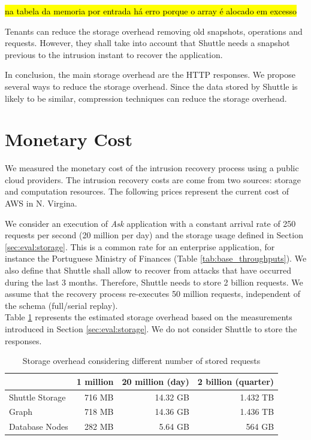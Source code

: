 \hl{na tabela da memoria por entrada há erro porque o array é alocado em excesso}


Tenants can reduce the storage overhead removing old snapshots, operations and requests. However, they shall take into account that Shuttle needs a snapshot previous to the intrusion instant to recover the application.

In conclusion, the main storage overhead are the \ac{HTTP} responses. We propose several ways to reduce the storage overhead. Since the data stored by Shuttle is likely to be similar, compression techniques can reduce the storage overhead.



\section{Monetary Cost}\label{sec:eval:cost}
We measured the monetary cost of the intrusion recovery process using a public cloud providers. The intrusion recovery costs are come from two sources: storage and computation resources. The following prices represent the current cost of \acf{AWS} in N. Virgina.

We consider an execution of \emph{Ask} application with a constant arrival rate of 250 requests per second (20 million per day) and the storage usage defined in Section \ref{sec:eval:storage}. This is a common rate for an enterprise application, for instance the Portuguese Ministry of Finances (Table \ref{tab:base_throughputs}). We also define that Shuttle shall allow to recover from attacks that have occurred during the last 3 months. Therefore, Shuttle needs to store 2 billion requests. We assume that the recovery process re-executes 50 million requests, independent of the schema (full/serial replay). \\

Table \ref{tab:storageScale} represents the estimated storage overhead based on the measurements introduced in Section \ref{sec:eval:storage}. We do not consider Shuttle to store the responses.%

\begin{table}[ht]
\centering
\begin{tabular}{l|rrr}
                  & 1 million   & 20 million (day)    & 2 billion (quarter) \\ \hline
Shuttle Storage   & 716 MB      & 14.32 GB            & 1.432 TB \\
Graph             & 718 MB      & 14.36 GB            & 1.436 TB \\
Database Nodes    & 282 MB      &  5.64 GB            & 564 GB   \\
\end{tabular}
\caption{Storage overhead considering different number of stored requests}
\label{tab:storageScale}
\end{table}


